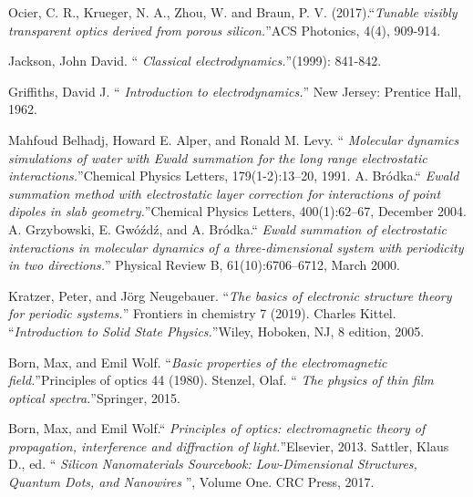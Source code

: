 \documentclass{article}
\begin{document}
\begin{thebibliography}{X}
 Ocier, C. R., Krueger, N. A., Zhou, W. and  Braun,
  P. V. (2017).\textquotedblleft \emph{Tunable visibly transparent
    optics derived from porous silicon.}\textquotedblright ACS
  Photonics, 4(4), 909-914.


  Jackson, John David. \textquotedblleft
  \emph{Classical electrodynamics.}\textquotedblright (1999): 841-842.

Griffiths, David J. \textquotedblleft
\emph{Introduction to electrodynamics.}\textquotedblright
 New Jersey: Prentice Hall, 1962.

  Mahfoud Belhadj, Howard E. Alper, and Ronald M. Levy. \textquotedblleft
 \emph{ Molecular dynamics simulations of water with Ewald summation
 	for the long range electrostatic interactions.}\textquotedblright Chemical
  Physics Letters, 179(1-2):13–20, 1991.
   A. Bródka.\textquotedblleft
   \emph{ Ewald summation method with electrostatic layer correction for
  interactions of point dipoles in slab geometry.}\textquotedblright Chemical
Physics Letters, 400(1):62–67, December 2004.
  A. Grzybowski, E. Gwóźdź, and A. Bródka.\textquotedblleft
 \emph{ Ewald summation of electrostatic interactions in molecular dynamics
 	 of a three-dimensional system with periodicity in two directions.}\textquotedblright
  Physical Review B, 61(10):6706–6712, March 2000.

  Kratzer, Peter, and Jörg Neugebauer. \textquotedblleft \emph{The basics of
 	electronic structure theory for periodic systems.}\textquotedblright
  Frontiers in chemistry 7 (2019).
  Charles Kittel. \textquotedblleft \emph{Introduction to Solid State
 	 Physics.}\textquotedblright Wiley, Hoboken, NJ, 8 edition, 2005.

 Born, Max, and Emil Wolf. \textquotedblleft \emph{Basic properties of 
   	the electromagnetic field.}\textquotedblright Principles of optics 44 (1980).
   Stenzel, Olaf. \textquotedblleft \emph{ The physics of thin film 
  	optical spectra.}\textquotedblright Springer, 2015.
  	
  Born, Max, and Emil Wolf.\textquotedblleft \emph{ Principles of optics: 
  	electromagnetic theory of propagation, interference
  	 and diffraction of light.}\textquotedblright Elsevier, 2013.
   Sattler, Klaus D., ed. \textquotedblleft \emph{ Silicon Nanomaterials 
  	Sourcebook: Low-Dimensional Structures, Quantum Dots, and Nanowires }\textquotedblright,
   Volume One. CRC Press, 2017.




\end{thebibliography}
\end{document}
